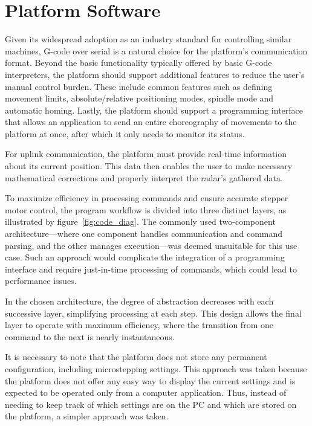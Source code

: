 \section{Platform Software}

Given its widespread adoption as an industry standard for controlling similar machines, G-code over serial is a natural choice for the platform's communication format.
Beyond the basic functionality typically offered by basic G-code interpreters, the platform should support additional features to reduce the user's manual control burden.
These include common features such as defining movement limits, absolute/relative positioning modes, spindle mode and automatic homing.
Lastly, the platform should support a programming interface that allows an application to send an entire choreography of movements to the platform at once, after which it only needs to monitor its status.

For uplink communication, the platform must provide real-time information about its current position.
This data then enables the user to make necessary mathematical corrections and properly interpret the radar's gathered data.

To maximize efficiency in processing commands and ensure accurate stepper motor control, the program workflow is divided into three distinct layers, as illustrated by figure~\ref{fig:code_diag}.
The commonly used two-component architecture—where one component handles communication and command parsing, and the other manages execution—was deemed unsuitable for this use case.
Such an approach would complicate the integration of a programming interface and require just-in-time processing of commands, which could lead to performance issues.

In the chosen architecture, the degree of abstraction decreases with each successive layer, simplifying processing at each step.
This design allows the final layer to operate with maximum efficiency, where the transition from one command to the next is nearly instantaneous.

It is necessary to note that the platform does not store any permanent configuration, including microstepping settings.
This approach was taken because the platform does not offer any easy way to display the current settings and is expected to be operated only from a computer application.
Thus, instead of needing to keep track of which settings are on the PC and which are stored on the platform, a simpler approach was taken.


